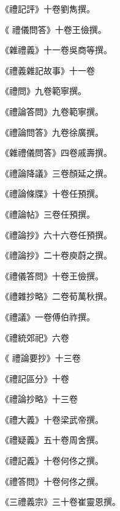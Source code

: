 \begin{pinyinscope}
 《禮記評》十卷劉雋撰。



 《
 禮儀問答》十卷王儉撰。



 《雜禮義》十一卷吳商等撰。



 《禮義雜記故事》十一卷



 《禮問》九卷範寧撰。



 《禮論答問》九卷範寧撰。



 《禮論問答》九卷徐廣撰。



 《雜禮儀問答》四卷戚壽撰。



 《禮論降議》三卷顏延之撰。



 《禮論條牒》十卷任預撰。



 《禮論帖》三卷任預撰。



 《禮論抄》六十六卷任預撰。



 《禮論抄》二十卷庾蔚之撰。



 《禮儀答問》十卷王儉撰。



 《禮雜抄略》二卷荀萬秋撰。



 《禮議》一卷傅伯祚撰。



 《禮統郊祀》六卷



 《
 禮論要抄》十三卷



 《禮記區分》十卷



 《禮論抄略》十三卷



 《禮大義》十卷梁武帝撰。



 《禮疑義》五十卷周舍撰。



 《禮記義》十卷何佟之撰。



 《禮答問》十卷何佟之撰。



 《三禮義宗》三十卷崔靈恩撰。




\end{pinyinscope}
